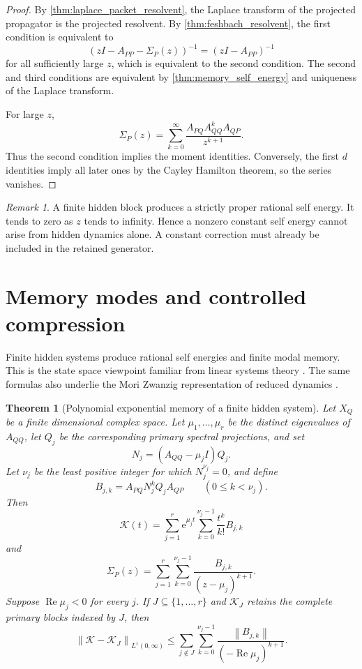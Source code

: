 \documentclass{aomart}
\newtheorem{theorem}{Theorem}[section]
\theoremstyle{definition}
\theoremstyle{remark}
\newtheorem{remark}[remark]{Remark}
\newcommand{\Kcal}{\mathcal K}
\newcommand{\e}{\mathrm e}
\newcommand{\norm}[1]{\left\lVert#1\right\rVert}
\begin{document}
\begin{proof}
By \cref{thm:laplace_packet_resolvent}, the Laplace transform of the projected propagator is the projected resolvent. By \cref{thm:feshbach_resolvent}, the first condition is equivalent to
\[
(zI-A_{PP}-\Sigma_P(z))^{-1}
=
(zI-A_{PP})^{-1}
\]
for all sufficiently large \(z\), which is equivalent to the second condition. The second and third conditions are equivalent by \cref{thm:memory_self_energy} and uniqueness of the Laplace transform.

For large \(z\),
\[
\Sigma_P(z)
=
\sum_{k=0}^{\infty}
\frac{A_{PQ}A_{QQ}^kA_{QP}}{z^{k+1}}.
\]
Thus the second condition implies the moment identities. Conversely, the first \(d\) identities imply all later ones by the Cayley Hamilton theorem, so the series vanishes.
\end{proof}

\begin{remark}
A finite hidden block produces a strictly proper rational self energy. It tends to zero as \(z\) tends to infinity. Hence a nonzero constant self energy cannot arise from hidden dynamics alone. A constant correction must already be included in the retained generator.
\end{remark}

\section{Memory modes and controlled compression}\label{sec:memory_compression}

Finite hidden systems produce rational self energies and finite modal memory. This is the state space viewpoint familiar from linear systems theory \cite{Kailath1980}. The same formulas also underlie the Mori Zwanzig representation of reduced dynamics \cite{Zwanzig1961,ChorinHaldKupferman2000}.

\begin{theorem}[Polynomial exponential memory of a finite hidden system]\label{thm:modal_memory}
Let \(X_Q\) be a finite dimensional complex space. Let \(\mu_1,\ldots,\mu_r\) be the distinct eigenvalues of \(A_{QQ}\), let \(Q_j\) be the corresponding primary spectral projections, and set
\[
N_j=(A_{QQ}-\mu_jI)Q_j.
\]
Let \(\nu_j\) be the least positive integer for which \(N_j^{\nu_j}=0\), and define
\[
B_{j,k}
=
A_{PQ}N_j^kQ_jA_{QP}
\qquad
(0\leq k<\nu_j).
\]
Then
\[
\Kcal(t)
=
\sum_{j=1}^r
\e^{\mu_jt}
\sum_{k=0}^{\nu_j-1}
\frac{t^k}{k!}B_{j,k}
\]
and
\[
\Sigma_P(z)
=
\sum_{j=1}^r
\sum_{k=0}^{\nu_j-1}
\frac{B_{j,k}}{(z-\mu_j)^{k+1}}.
\]
Suppose \(\operatorname{Re}\mu_j<0\) for every \(j\). If \(J\subseteq\{1,\ldots,r\}\) and \(\Kcal_J\) retains the complete primary blocks indexed by \(J\), then
\[
\norm{\Kcal-\Kcal_J}_{L^1(0,\infty)}
\leq
\sum_{j\notin J}
\sum_{k=0}^{\nu_j-1}
\frac{\norm{B_{j,k}}}
{(-\operatorname{Re}\mu_j)^{k+1}}.
\]
\end{theorem}
\end{document}
